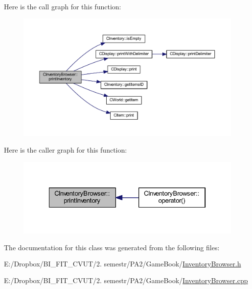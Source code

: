 Here is the call graph for this function\+:\nopagebreak
\begin{figure}[H]
\begin{center}
\leavevmode
\includegraphics[width=350pt]{class_c_inventory_browser_a022cb6fc703bd156921816554c7a18b8_cgraph}
\end{center}
\end{figure}
Here is the caller graph for this function\+:\nopagebreak
\begin{figure}[H]
\begin{center}
\leavevmode
\includegraphics[width=322pt]{class_c_inventory_browser_a022cb6fc703bd156921816554c7a18b8_icgraph}
\end{center}
\end{figure}


The documentation for this class was generated from the following files\+:\begin{DoxyCompactItemize}
\item 
E\+:/\+Dropbox/\+B\+I\+\_\+\+F\+I\+T\+\_\+\+C\+V\+U\+T/2. semestr/\+P\+A2/\+Game\+Book/\mbox{\hyperlink{_inventory_browser_8h}{Inventory\+Browser.\+h}}\item 
E\+:/\+Dropbox/\+B\+I\+\_\+\+F\+I\+T\+\_\+\+C\+V\+U\+T/2. semestr/\+P\+A2/\+Game\+Book/\mbox{\hyperlink{_inventory_browser_8cpp}{Inventory\+Browser.\+cpp}}\end{DoxyCompactItemize}
